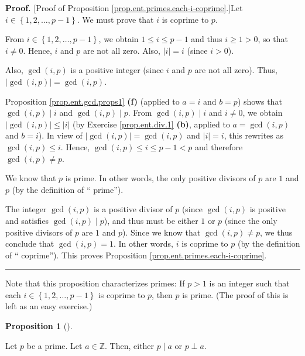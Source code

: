 \documentclass[numbers=enddot,12pt,final,onecolumn,notitlepage]{scrartcl}%
\newcounter{exer}
\numberwithin{exer}{subsection}
\theoremstyle{definition}
\newtheorem{prop}[theo]{Proposition}
\newenvironment{proposition}[1][]
{\begin{prop}[#1]\begin{leftbar}}
{\end{leftbar}\end{prop}}
\newenvironment{proof}[1][Proof]{\noindent\textbf{#1.} }{\ \rule{0.5em}{0.5em}}
\begin{document}
\begin{proof}
[Proof of Proposition \ref{prop.ent.primes.each-i-coprime}.]Let $i\in\left\{
1,2,\ldots,p-1\right\}  $. We must prove that $i$ is coprime to $p$.

From $i\in\left\{  1,2,\ldots,p-1\right\}  $, we obtain $1\leq i\leq p-1$ and
thus $i\geq1>0$, so that $i\neq0$. Hence, $i$ and $p$ are not all zero. Also,
$\left\vert i\right\vert =i$ (since $i>0$).

Also, $\gcd\left(  i,p\right)  $ is a positive integer (since $i$ and $p$ are
not all zero). Thus, $\left\vert \gcd\left(  i,p\right)  \right\vert
=\gcd\left(  i,p\right)  $.

Proposition \ref{prop.ent.gcd.props1} \textbf{(f)} (applied to $a=i$ and
$b=p$) shows that $\gcd\left(  i,p\right)  \mid i$ and $\gcd\left(
i,p\right)  \mid p$. From $\gcd\left(  i,p\right)  \mid i$ and $i\neq0$, we
obtain $\left\vert \gcd\left(  i,p\right)  \right\vert \leq\left\vert
i\right\vert $ (by Exercise \ref{prop.ent.div.1} \textbf{(b)}, applied to
$a=\gcd\left(  i,p\right)  $ and $b=i$). In view of $\left\vert \gcd\left(
i,p\right)  \right\vert =\gcd\left(  i,p\right)  $ and $\left\vert
i\right\vert =i$, this rewrites as $\gcd\left(  i,p\right)  \leq i$. Hence,
$\gcd\left(  i,p\right)  \leq i\leq p-1<p$ and therefore $\gcd\left(
i,p\right)  \neq p$.

We know that $p$ is prime. In other words, the only positive divisors of $p$
are $1$ and $p$ (by the definition of \textquotedblleft
prime\textquotedblright).

The integer $\gcd\left(  i,p\right)  $ is a positive divisor of $p$ (since
$\gcd\left(  i,p\right)  $ is positive and satisfies $\gcd\left(  i,p\right)
\mid p$), and thus must be either $1$ or $p$ (since the only positive divisors
of $p$ are $1$ and $p$). Since we know that $\gcd\left(  i,p\right)  \neq p$,
we thus conclude that $\gcd\left(  i,p\right)  =1$. In other words, $i$ is
coprime to $p$ (by the definition of \textquotedblleft
coprime\textquotedblright). This proves Proposition
\ref{prop.ent.primes.each-i-coprime}.
\end{proof}

Note that this proposition characterizes primes: If $p>1$ is an integer such
that each $i\in\left\{  1,2,\ldots,p-1\right\}  $ is coprime to $p$, then $p$
is prime. (The proof of this is left as an easy exercise.)

\begin{proposition}
\label{prop.ent.primes.div-or-coprime}Let $p$ be a prime. Let $a\in\mathbb{Z}%
$. Then, either $p\mid a$ or $p\perp a$.
\end{proposition}
\end{document}

